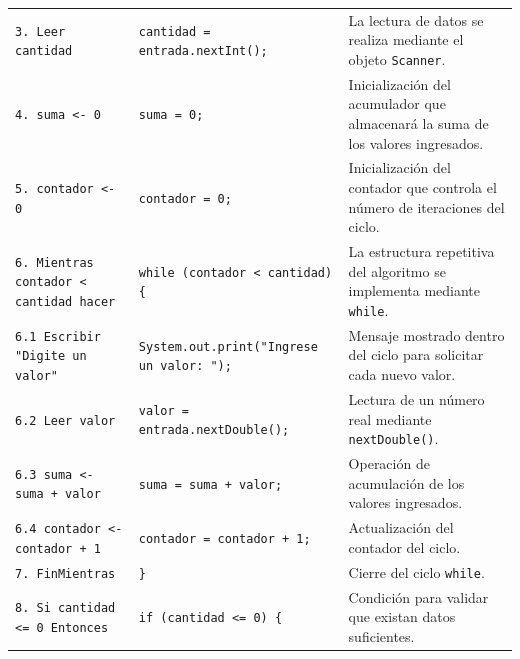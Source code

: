 \documentclass[12pt,twoside]{book}
\begin{document}
\begin{landscape}
\begin{longtable}{p{6cm} p{6cm} p{7.5cm}}
							
							\texttt{3. Leer cantidad}
							&
							\texttt{cantidad = entrada.nextInt();}
							&
							La lectura de datos se realiza mediante el objeto \texttt{Scanner}. \\
							
							
							\texttt{4. suma <- 0}
							&
							\texttt{suma = 0;}
							&
							Inicialización del acumulador que almacenará la suma de los valores ingresados. \\
							
							
							\texttt{5. contador <- 0}
							&
							\texttt{contador = 0;}
							&
							Inicialización del contador que controla el número de iteraciones del ciclo. \\
							
							
							\texttt{6. Mientras contador < cantidad hacer}
							&
							\texttt{while (contador < cantidad) \{}
							&
							La estructura repetitiva del algoritmo se implementa mediante \texttt{while}. \\
							
							
							\texttt{6.1 Escribir "Digite un valor"}
							&
							\texttt{System.out.print("Ingrese un valor: ");}
							&
							Mensaje mostrado dentro del ciclo para solicitar cada nuevo valor. \\
							
							
							\texttt{6.2 Leer valor}
							&
							\texttt{valor = entrada.nextDouble();}
							&
							Lectura de un número real mediante \texttt{nextDouble()}. \\
							
							
							\texttt{6.3 suma <- suma + valor}
							&
							\texttt{suma = suma + valor;}
							&
							Operación de acumulación de los valores ingresados. \\
							
							
							\texttt{6.4 contador <- contador + 1}
							&
							\texttt{contador = contador + 1;}
							&
							Actualización del contador del ciclo. \\
							
							
							\texttt{7. FinMientras}
							&
							\texttt{\}}
							&
							Cierre del ciclo \texttt{while}. \\
							
							
							\texttt{8. Si cantidad <= 0 Entonces}
							&
							\texttt{if (cantidad <= 0) \{}
							&
							Condición para validar que existan datos suficientes. \\
							

\end{longtable}
\end{landscape}
\end{document}
